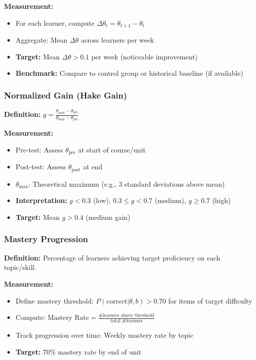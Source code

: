 \documentclass[11pt,letterpaper]{article}
\begin{document}
\textbf{Measurement:}
\begin{itemize}
\item For each learner, compute $\Delta\theta_t = \theta_{t+1} - \theta_t$
\item Aggregate: Mean $\Delta\theta$ across learners per week
\item \textbf{Target:} Mean $\Delta\theta > 0.1$ per week (noticeable improvement)
\item \textbf{Benchmark:} Compare to control group or historical baseline (if available)
\end{itemize}

\subsubsection{Normalized Gain (Hake Gain)}

\textbf{Definition:} $g = \frac{\theta_{\text{post}} - \theta_{\text{pre}}}{\theta_{\text{max}} - \theta_{\text{pre}}}$

\textbf{Measurement:}
\begin{itemize}
\item Pre-test: Assess $\theta_{\text{pre}}$ at start of course/unit
\item Post-test: Assess $\theta_{\text{post}}$ at end
\item $\theta_{\text{max}}$: Theoretical maximum (e.g., 3 standard deviations above mean)
\item \textbf{Interpretation:} $g < 0.3$ (low), $0.3 \leq g < 0.7$ (medium), $g \geq 0.7$ (high)
\item \textbf{Target:} Mean $g > 0.4$ (medium gain)
\end{itemize}

\subsubsection{Mastery Progression}

\textbf{Definition:} Percentage of learners achieving target proficiency on each topic/skill.

\textbf{Measurement:}
\begin{itemize}
\item Define mastery threshold: $P(\text{correct} | \theta, b) > 0.70$ for items of target difficulty
\item Compute: $\text{Mastery Rate} = \frac{\text{\# learners above threshold}}{\text{total \# learners}}$
\item Track progression over time: Weekly mastery rate by topic
\item \textbf{Target:} 70\% mastery rate by end of unit
\end{itemize}
\end{document}
